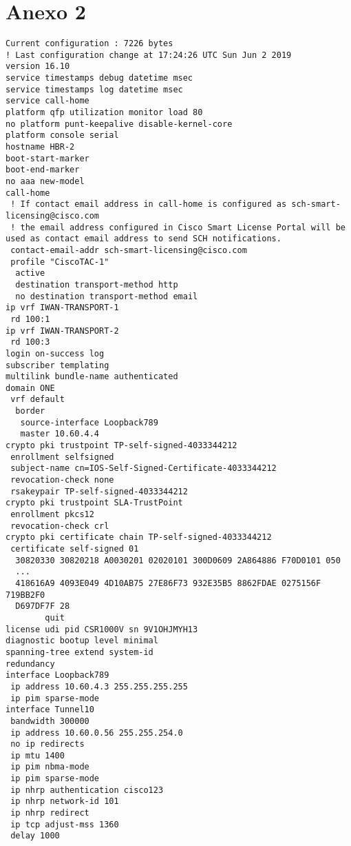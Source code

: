 \chapter{Anexo 2}
\label{ann:lorem_ipsum2}

\lstset{language=java, caption=HBR2 Configuration, label=lst:YANG}
\begin{lstlisting}
Current configuration : 7226 bytes
! Last configuration change at 17:24:26 UTC Sun Jun 2 2019
version 16.10
service timestamps debug datetime msec
service timestamps log datetime msec
service call-home
platform qfp utilization monitor load 80
no platform punt-keepalive disable-kernel-core
platform console serial
hostname HBR-2
boot-start-marker
boot-end-marker
no aaa new-model
call-home
 ! If contact email address in call-home is configured as sch-smart-licensing@cisco.com
 ! the email address configured in Cisco Smart License Portal will be used as contact email address to send SCH notifications.
 contact-email-addr sch-smart-licensing@cisco.com
 profile "CiscoTAC-1"
  active
  destination transport-method http
  no destination transport-method email
ip vrf IWAN-TRANSPORT-1
 rd 100:1
ip vrf IWAN-TRANSPORT-2
 rd 100:3
login on-success log
subscriber templating
multilink bundle-name authenticated
domain ONE
 vrf default
  border
   source-interface Loopback789
   master 10.60.4.4
crypto pki trustpoint TP-self-signed-4033344212
 enrollment selfsigned
 subject-name cn=IOS-Self-Signed-Certificate-4033344212
 revocation-check none
 rsakeypair TP-self-signed-4033344212
crypto pki trustpoint SLA-TrustPoint
 enrollment pkcs12
 revocation-check crl
crypto pki certificate chain TP-self-signed-4033344212
 certificate self-signed 01
  30820330 30820218 A0030201 02020101 300D0609 2A864886 F70D0101 050
  ...
  418616A9 4093E049 4D10AB75 27E86F73 932E35B5 8862FDAE 0275156F 719BB2F0
  D697DF7F 28
        quit
license udi pid CSR1000V sn 9V1OHJMYH13
diagnostic bootup level minimal
spanning-tree extend system-id
redundancy
interface Loopback789
 ip address 10.60.4.3 255.255.255.255
 ip pim sparse-mode
interface Tunnel10
 bandwidth 300000
 ip address 10.60.0.56 255.255.254.0
 no ip redirects
 ip mtu 1400
 ip pim nbma-mode
 ip pim sparse-mode
 ip nhrp authentication cisco123
 ip nhrp network-id 101
 ip nhrp redirect
 ip tcp adjust-mss 1360
 delay 1000

\end{lstlisting}
